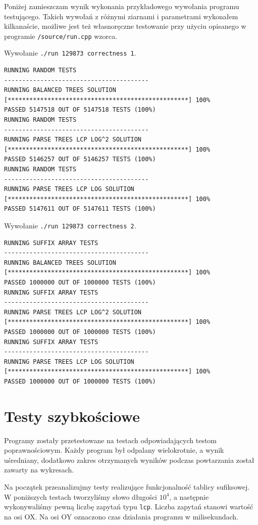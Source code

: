 \documentclass[declaration,shortabstract]{iithesis}
\theoremstyle{definition} \newtheorem{definition}{Definicja}[chapter]
\theoremstyle{remark} \newtheorem{remark}[definition]{Obserwacja}
\theoremstyle{plain} \newtheorem{theorem}[definition]{Twierdzenie}
\theoremstyle{remark} \newtheorem{example}{Przykład}[definition]
\theoremstyle{plain} \newtheorem{lemma}[definition]{Lemat}
\begin{document}
Poniżej zamieszczam wynik wykonania przykładowego wywołania programu testującego. Takich wywołań z różnymi ziarnami i parametrami wykonałem kilkanaście, możliwe jest też własnoręczne testowanie przy użyciu opisanego w programie \texttt{/source/run.cpp} wzorca.

\noindent
Wywołanie \texttt{./run 129873 correctness 1}.

\begin{lstlisting}[basicstyle=\tiny,frame=single]
RUNNING RANDOM TESTS
----------------------------------------
RUNNING BALANCED TREES SOLUTION
[**************************************************] 100%
PASSED 5147518 OUT OF 5147518 TESTS (100%)
RUNNING RANDOM TESTS
----------------------------------------
RUNNING PARSE TREES LCP LOG^2 SOLUTION
[**************************************************] 100%
PASSED 5146257 OUT OF 5146257 TESTS (100%)
RUNNING RANDOM TESTS
----------------------------------------
RUNNING PARSE TREES LCP LOG SOLUTION
[**************************************************] 100%
PASSED 5147611 OUT OF 5147611 TESTS (100%)
\end{lstlisting}

\noindent
Wywołanie \texttt{./run 129873 correctness 2}.

\begin{lstlisting}[basicstyle=\tiny,frame=single]
RUNNING SUFFIX ARRAY TESTS
----------------------------------------
RUNNING BALANCED TREES SOLUTION
[**************************************************] 100%
PASSED 1000000 OUT OF 1000000 TESTS (100%)
RUNNING SUFFIX ARRAY TESTS
----------------------------------------
RUNNING PARSE TREES LCP LOG^2 SOLUTION
[**************************************************] 100%
PASSED 1000000 OUT OF 1000000 TESTS (100%)
RUNNING SUFFIX ARRAY TESTS
----------------------------------------
RUNNING PARSE TREES LCP LOG SOLUTION
[**************************************************] 100%
PASSED 1000000 OUT OF 1000000 TESTS (100%)    
\end{lstlisting}

\section{Testy szybkościowe}

Programy zostały przetestowane na testach odpowiadających testom poprawnościowym. Każdy program był odpalany wielokrotnie, a wynik uśredniany, dodatkowo zakres otrzymanych wyników podczas powtarzania został zawarty na wykresach.

Na początek przeanalizujmy testy realizujące funkcjonalność tablicy sufiksowej. W poniższych testach tworzyliśmy słowo długości $10^4$, a następnie wykonywaliśmy pewną liczbę zapytań typu \texttt{lcp}. Liczba zapytań stanowi wartość na osi OX. Na osi OY oznaczono czas działania programu w milisekundach.
\end{document}
